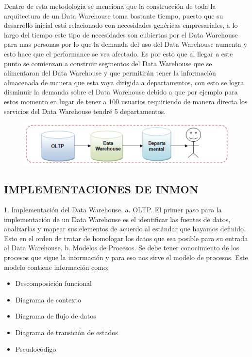 \documentclass[preprint,12pt]{elsarticle}
\begin{document}
Dentro de esta metodología se menciona que la construcción de toda la arquitectura de un Data Warehouse toma bastante tiempo, puesto que su desarrollo inicial está relacionado con
necesidades genéricas empresariales, a lo largo del tiempo este tipo de necesidades son cubiertas por el Data Warehouse para mas personas por lo que la demanda del uso del Data
Warehouse aumenta y esto hace que el performance se vea afectado. Es por esto que al llegar a este punto se comienzan a construir segmentos del Data Warehouse que se alimentaran del
Data Warehouse y que permitirán tener la información almacenada de manera que esta vaya dirigida a departamentos, con esto se logra disminuir la demanda sobre el Data Warehouse
debido a que por ejemplo para estos momento en lugar de tener a 100 usuarios requiriendo de manera directa los servicios del Data Warehouse tendré 5 departamentos.

\begin{figure}[htb]
			\begin{center}
					\includegraphics[width=15cm]{./IMAGENES/imgmire2}
				\end{center}
			\end{figure}

\subsection{IMPLEMENTACIONES DE  INMON}
1. Implementación del Data Warehouse.
	a. OLTP. El primer paso para la implementación de un Data Warehouse es el identificar las fuentes de datos, analizarlas y mapear sus elementos de acuerdo al estándar que hayamos definido. Esto en el orden de tratar de homologar los datos que sea posible para su entrada al Data Warehouse.
	b. Modelos de Procesos. Se debe tener conocimiento de los procesos que sigue la información y para eso nos sirve el modelo de procesos. Este modelo contiene información como:
\begin{itemize}
	\item Descomposición funcional
	\item Diagrama de contexto
	\item Diagrama de flujo de datos
	\item Diagrama de transición de estados
	\item Pseudocódigo
\end{itemize}
\end{document}
